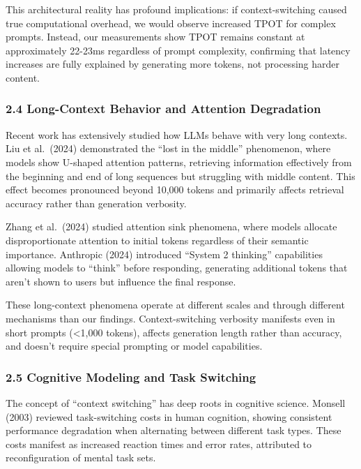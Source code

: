 \documentclass[
  11pt]{article}
\begin{document}
This architectural reality has profound implications: if
context-switching caused true computational overhead, we would observe
increased TPOT for complex prompts. Instead, our measurements show TPOT
remains constant at approximately 22-23ms regardless of prompt
complexity, confirming that latency increases are fully explained by
generating more tokens, not processing harder content.

\subsubsection{2.4 Long-Context Behavior and Attention
Degradation}\label{long-context-behavior-and-attention-degradation}

Recent work has extensively studied how LLMs behave with very long
contexts. Liu et al.~(2024) demonstrated the ``lost in the middle''
phenomenon, where models show U-shaped attention patterns, retrieving
information effectively from the beginning and end of long sequences but
struggling with middle content. This effect becomes pronounced beyond
10,000 tokens and primarily affects retrieval accuracy rather than
generation verbosity.

Zhang et al.~(2024) studied attention sink phenomena, where models
allocate disproportionate attention to initial tokens regardless of
their semantic importance. Anthropic (2024) introduced ``System 2
thinking'' capabilities allowing models to ``think'' before responding,
generating additional tokens that aren't shown to users but influence
the final response.

These long-context phenomena operate at different scales and through
different mechanisms than our findings. Context-switching verbosity
manifests even in short prompts (\textless1,000 tokens), affects
generation length rather than accuracy, and doesn't require special
prompting or model capabilities.

\subsubsection{2.5 Cognitive Modeling and Task
Switching}\label{cognitive-modeling-and-task-switching}

The concept of ``context switching'' has deep roots in cognitive
science. Monsell (2003) reviewed task-switching costs in human
cognition, showing consistent performance degradation when alternating
between different task types. These costs manifest as increased reaction
times and error rates, attributed to reconfiguration of mental task
sets.
\end{document}
